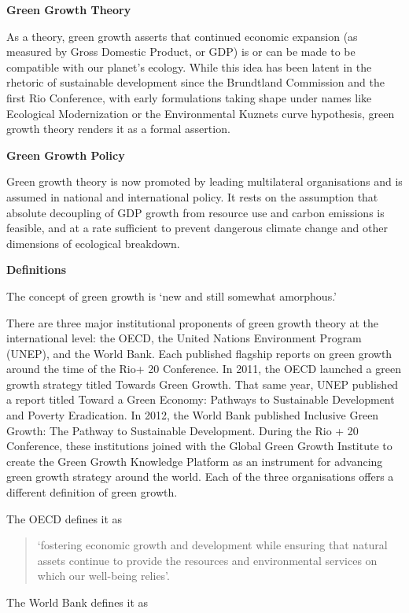\documentclass[
]{book}
\begin{document}
\textbf{Green Growth Theory}

As a theory, green growth asserts that continued
economic expansion (as measured by Gross Domestic Product, or GDP) is or can be made to be
compatible with our planet's ecology.
While this idea has been latent in the rhetoric of sustainable development
since the Brundtland Commission and the first Rio Conference, with
early formulations taking shape under names like Ecological Modernization or
the Environmental Kuznets curve hypothesis,
green growth theory renders it as a formal assertion.

\textbf{Green Growth Policy}

Green growth theory is now promoted by leading multilateral organisations and is assumed in
national and international policy. It rests on the assumption that absolute decoupling of GDP
growth from resource use and carbon emissions is feasible, and at a rate
sufficient to prevent dangerous climate change and other dimensions of ecological breakdown.

\textbf{Definitions}

The concept of green growth is `new and still somewhat amorphous.'

There are three major institutional proponents of green growth theory at the international level: the
OECD, the United Nations Environment Program (UNEP), and the World Bank. Each published flagship
reports on green growth around the time of the Rio+ 20 Conference. In 2011, the OECD launched a
green growth strategy titled Towards Green Growth. That same year, UNEP published a report titled
Toward a Green Economy: Pathways to Sustainable Development and Poverty Eradication. In 2012, the
World Bank published Inclusive Green Growth: The Pathway to Sustainable Development. During the Rio
+ 20 Conference, these institutions joined with the Global Green Growth Institute to create the Green
Growth Knowledge Platform as an instrument for advancing green growth strategy around the world.
Each of the three organisations offers a different definition of green growth.

The OECD defines it as

\begin{quote}
`fostering economic growth and development while ensuring that natural assets continue to provide
the resources and environmental services on which our well-being relies'.
\end{quote}

The World Bank defines it as
\end{document}
